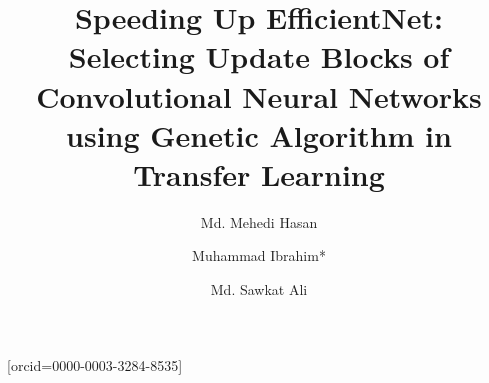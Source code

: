 \documentclass[a4paper,fleqn]{cas-sc}
\begin{document}
\let\WriteBookmarks\relax
\def\floatpagepagefraction{1}
\def\textpagefraction{.001}




\title [mode = title]{Speeding Up EfficientNet: Selecting Update Blocks of Convolutional Neural Networks using Genetic Algorithm in Transfer Learning}

%
\begin{comment}
\author[1]{Md. Mehedi Hasan}[type=editor,
                        auid=000,bioid=1,
                        orcid=0000-0001-6826-668X]

\ead{mehedi.mailing@gmail.com}

\ead[url]{www.iammehedi.me}

\credit{Conceptualization, Investigation, Software, Methodology, Validation, Visualization, Writing - original draft}

\affiliation[1]{organization={East West University},
    addressline={A/2 Jahurul Islam Ave},
    city={Dhaka},
    postcode={1212},
    country={Bangladesh}}
\end{comment}



\author[1]{Md. Mehedi Hasan}
\address[1]{Dept. of Computer Science and Engineering, East West University, Dhaka, Bangladesh}
\author[2]{Muhammad Ibrahim*} [orcid=0000-0003-3284-8535]
\address[2]{Dept. of Computer Science and Engineering, Univeristy of Dhaka, Dhaka, Bangladesh}
\author[1]{Md. Sawkat Ali}
\end{document}
